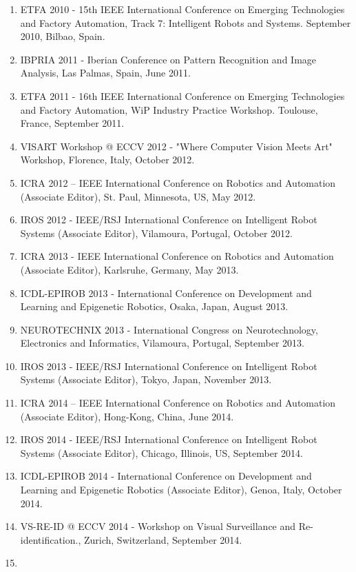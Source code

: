 \begin{enumerate}
  Recognition, July 2010, Póvoa do Varzim, Portugal.
\item
  ETFA 2010 - 15th IEEE International Conference on Emerging
  Technologies and Factory Automation, Track 7: Intelligent Robots and
  Systems. September 2010, Bilbao, Spain.
\item
  IBPRIA 2011 - Iberian Conference on Pattern Recognition and Image
  Analysis, Las Palmas, Spain, June 2011.
\item
  ETFA 2011 - 16th IEEE International Conference on Emerging
  Technologies and Factory Automation, WiP Industry Practice Workshop.
  Toulouse, France, September 2011.
\item
  VISART Workshop @ ECCV 2012 - "Where Computer Vision Meets Art"
  Workshop, Florence, Italy, October 2012.
\item
  ICRA 2012 -- IEEE International Conference on Robotics and Automation
  (Associate Editor), St. Paul, Minnesota, US, May 2012.
\item
  IROS 2012 - IEEE/RSJ International Conference on Intelligent Robot
  Systems (Associate Editor), Vilamoura, Portugal, October 2012.
\item
  ICRA 2013 - IEEE International Conference on Robotics and Automation
  (Associate Editor), Karlsruhe, Germany, May 2013.
\item
  ICDL-EPIROB 2013 - International Conference on Development and
  Learning and Epigenetic Robotics, Osaka, Japan, August 2013.
\item
  NEUROTECHNIX 2013 - International Congress on Neurotechnology,
  Electronics and Informatics, Vilamoura, Portugal, September 2013.
\item
  IROS 2013 - IEEE/RSJ International Conference on Intelligent Robot
  Systems (Associate Editor), Tokyo, Japan, November 2013.
\item
  ICRA 2014 -- IEEE International Conference on Robotics and Automation
  (Associate Editor), Hong-Kong, China, June 2014.
\item
  IROS 2014 - IEEE/RSJ International Conference on Intelligent Robot
  Systems (Associate Editor), Chicago, Illinois, US, September 2014.
\item
  ICDL-EPIROB 2014 - International Conference on Development and
  Learning and Epigenetic Robotics (Associate Editor), Genoa, Italy,
  October 2014.
\item
  VS-RE-ID @ ECCV 2014 - Workshop on Visual Surveillance and
  Re-identification., Zurich, Switzerland, September 2014.
\item

\end{enumerate}
